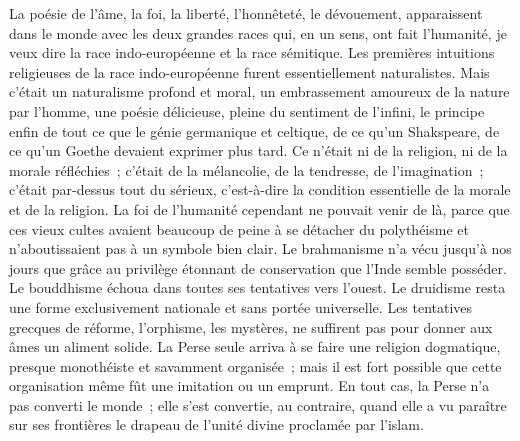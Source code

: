 \documentclass[french,twoside]{book} %
\begin{document}
La poésie de l’âme, la foi, la liberté, l’honnêteté, le dévouement, apparaissent dans le monde avec les deux grandes races qui, en un sens, ont fait l’humanité, je veux dire la race indo-européenne et la race sémitique. Les premières intuitions religieuses de la race indo-européenne furent essentiellement naturalistes. Mais c’était un naturalisme profond et moral, un embrassement amoureux de la nature par l’homme, une poésie délicieuse, pleine du sentiment de l’infini, le principe enfin de tout ce que le génie germanique et celtique, de ce qu’un Shakspeare, de ce qu’un Goethe devaient exprimer plus tard. Ce n’était ni de la religion, ni de la morale réfléchies ; c’était de la mélancolie, de la tendresse, de l’imagination ; c’était par-dessus tout du sérieux, c’est-à-dire la condition essentielle de la morale et de la religion. La foi de l’humanité cependant ne pouvait venir de là, parce que ces vieux cultes avaient beaucoup de peine à se détacher du polythéisme et n’aboutissaient pas à un symbole bien clair. Le brahmanisme n’a vécu jusqu’à nos jours que grâce au privilège étonnant de conservation que l’Inde semble posséder. Le bouddhisme échoua dans toutes ses tentatives vers l’ouest. Le druidisme resta une forme exclusivement nationale et sans portée universelle. Les tentatives grecques de réforme, l’orphisme, les mystères, ne suffirent pas pour donner aux âmes un aliment solide. La Perse seule arriva à se faire une religion dogmatique, presque monothéiste et savamment organisée ; mais il est fort possible que cette organisation même fût une imitation ou un emprunt. En tout cas, la Perse n’a pas converti le monde ; elle s’est convertie, au contraire, quand elle a vu paraître sur ses frontières le drapeau de l’unité divine proclamée par l’islam.\par
\end{document}
